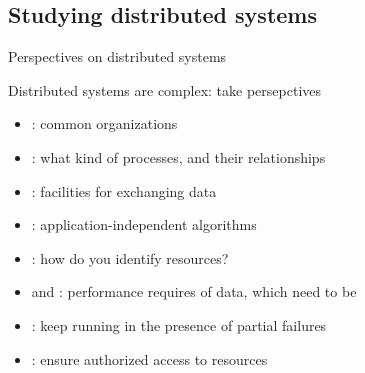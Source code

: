 \subsection{Studying distributed systems}
\begin{slide}{Perspectives on distributed systems}
  \begin{block}{Distributed systems are complex: take persepctives}
    \begin{itemize}\firmlist
    \item {}: common organizations
    \item {}: what kind of processes, and their relationships
    \item {}: facilities for exchanging data
    \item {}: application-independent algorithms
    \item {}: how do you identify resources?
    \item {} and : performance requires of data, which need to be 
    \item {}: keep running in the presence of partial failures
    \item {}: ensure authorized access to resources
    \end{itemize}
  \end{block}
\end{slide}
